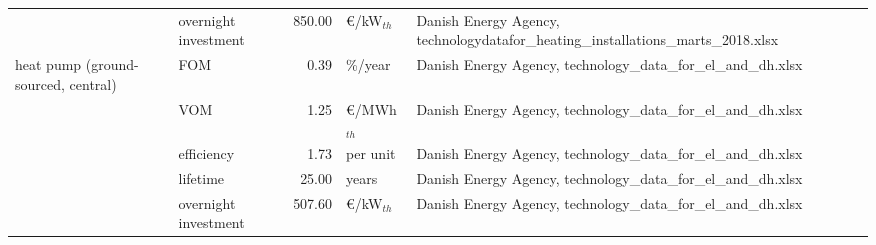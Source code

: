 \begin{longtable}{p{4cm}p{4cm}rp{3cm}p{10cm}}
                      & overnight investment &       850.00 &               \euro/kW$_{th}$ &                                                                                                                                                                                                                                                    Danish Energy Agency, technologydatafor\_heating\_installations\_marts\_2018.xlsx \\
heat pump (ground-sourced, central) & FOM &         0.39 &                       \%/year &                                                                                                                                                                                                                                                                        Danish Energy Agency, technology\_data\_for\_el\_and\_dh.xlsx \\
                      & VOM &         1.25 &              \euro/MWh$_{th}$ &                                                                                                                                                                                                                                                                        Danish Energy Agency, technology\_data\_for\_el\_and\_dh.xlsx \\
                      & efficiency &         1.73 &                      per unit &                                                                                                                                                                                                                                                                        Danish Energy Agency, technology\_data\_for\_el\_and\_dh.xlsx \\
                      & lifetime &        25.00 &                         years &                                                                                                                                                                                                                                                                        Danish Energy Agency, technology\_data\_for\_el\_and\_dh.xlsx \\
                      & overnight investment &       507.60 &              \euro/kW$_{th}$  &                                                                                                                                                                                                                                                                        Danish Energy Agency, technology\_data\_for\_el\_and\_dh.xlsx \\

\end{longtable}
